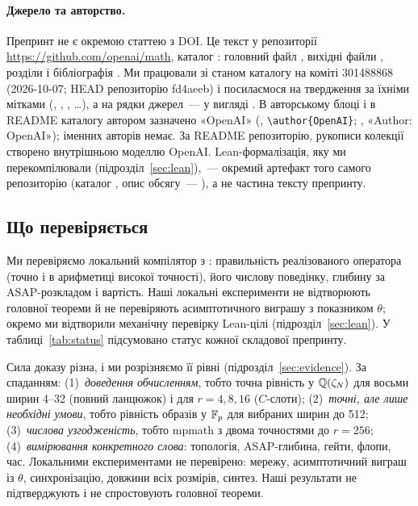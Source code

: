 \documentclass[11pt]{article}
\theoremstyle{plain}
\begin{document}
\paragraph{Джерело та авторство.}
Препринт не є окремою статтею з DOI. Це текст у репозиторії \url{https://github.com/openai/math}, каталог : головний файл , вихідні файли , розділи  і бібліографія . Ми працювали зі станом каталогу на коміті 301488868 (2026-10-07; HEAD репозиторію fd4aeeb) і посилаємося на твердження за їхніми мітками (, , , \dots), а на рядки джерел~--- у вигляді . В авторському блоці і в README каталогу автором зазначено «OpenAI» (, \verb|\author{OpenAI}|; , «Author: OpenAI»); іменних авторів немає. За README репозиторію, рукописи колекції створено внутрішньою моделлю OpenAI. Lean-формалізація, яку ми перекомпілювали (підрозділ~\ref{sec:lean}),~--- окремий артефакт того самого репозиторію (каталог , опис обсягу~--- ), а не частина тексту препринту.

\subsection{Що перевіряється}
Ми перевіряємо локальний компілятор з : правильність реалізованого оператора (точно і в арифметиці високої точності), його числову поведінку, глибину за ASAP-розкладом і вартість. Наші локальні експерименти не відтворюють головної теореми й не перевіряють асимптотичного виграшу з показником $\theta$; окремо ми відтворили механічну перевірку Lean-цілі (підрозділ~\ref{sec:lean}). У таблиці~\ref{tab:status} підсумовано статус кожної складової препринту.

Сила доказу різна, і ми розрізняємо її рівні (підрозділ~\ref{sec:evidence}). За спаданням: (1)~\emph{доведення обчисленням}, тобто точна рівність у $\mathbb{Q}(\zeta_N)$ для восьми ширин 4--32 (повний ланцюжок) і для $r=4,8,16$ ($C$-слоти); (2)~\emph{точні, але лише необхідні умови}, тобто рівність образів у $\mathbb{F}_p$ для вибраних ширин до 512; (3)~\emph{числова узгодженість}, тобто mpmath з двома точностями до $r=256$; (4)~\emph{вимірювання конкретного слова}: топологія, ASAP-глибина, гейти, флопи, час. Локальними експериментами не перевірено: мережу, асимптотичний виграш із $\theta$, синхронізацію, довжини всіх розмірів, синтез. Наші результати не підтверджують і не спростовують головної теореми.
\end{document}
